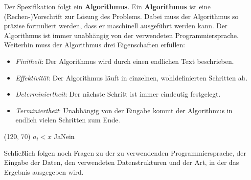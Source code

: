 \documentclass{scrreprt}
\begin{document}
Der Spezifikation folgt ein \textbf{Algorithmus}.
Ein \textbf{Algorithmus} ist eine (Rechen-)Vorschrift zur Lösung des Problems.
Dabei muss der Algorithmus so präzise formuliert werden, dass er maschinell
ausgeführt werden kann.
Der Algorithmus ist immer unabhängig von der verwendeten Programmiersprache.
Weiterhin muss der Algorithmus drei Eigenschaften erfüllen:
\begin{itemize}
\item \emph{Finitheit}: Der Algorithmus wird durch einen endlichen Text
  beschrieben.
\item \emph{Effektivität}: Der Algorithmus läuft in einzelnen, wohldefinierten
  Schritten ab.
\item \emph{Determiniertheit}: Der nächste Schritt ist immer eindeutig
  festgelegt.
\item \emph{Terminiertheit}: Unabhängig von der Eingabe kommt der Algorithmus
  in endlich vielen Schritten zum Ende.
\end{itemize}

\begin{struktogramm}(120, 70)
     {$a_i < x$} {Ja}{Nein}
      \change
    \ifend
  \whileend
\end{struktogramm}

Schließlich folgen noch Fragen zu der zu verwendenden Programmiersprache,
der Eingabe der Daten, den verwendeten Datenstrukturen und der Art, in der das
Ergebnis ausgegeben wird.
\end{document}

